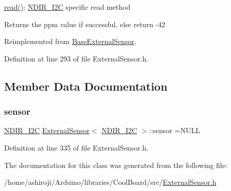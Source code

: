 \hyperlink{class_external_sensor_3_01_n_d_i_r___i2_c_01_4_a239d18652e9fb4673842ae9726edf44f}{read()}\+: \hyperlink{class_n_d_i_r___i2_c}{N\+D\+I\+R\+\_\+\+I2C} specific read method

\begin{DoxyReturn}{Returns}
the ppm value if successful, else return -\/42 
\end{DoxyReturn}


Reimplemented from \hyperlink{class_base_external_sensor_a1564f16deacf57b51b9948ac29db4291}{Base\+External\+Sensor}.



Definition at line 293 of file External\+Sensor.\+h.



\subsection{Member Data Documentation}
\mbox{\label{class_external_sensor_3_01_n_d_i_r___i2_c_01_4_ae541c9cece7c38674b70114cdb74a7dc}} 
\subsubsection{\texorpdfstring{sensor}{sensor}}
{\footnotesize\ttfamily \hyperlink{class_n_d_i_r___i2_c}{N\+D\+I\+R\+\_\+\+I2C} \hyperlink{class_external_sensor}{External\+Sensor}$<$ \hyperlink{class_n_d_i_r___i2_c}{N\+D\+I\+R\+\_\+\+I2C} $>$\+::sensor =N\+U\+LL\hspace{0.3cm}{\ttfamily [private]}}



Definition at line 335 of file External\+Sensor.\+h.



The documentation for this class was generated from the following file\+:\begin{DoxyCompactItemize}
\item 
/home/ashiroji/\+Arduino/libraries/\+Cool\+Board/src/\hyperlink{_external_sensor_8h}{External\+Sensor.\+h}\end{DoxyCompactItemize}
